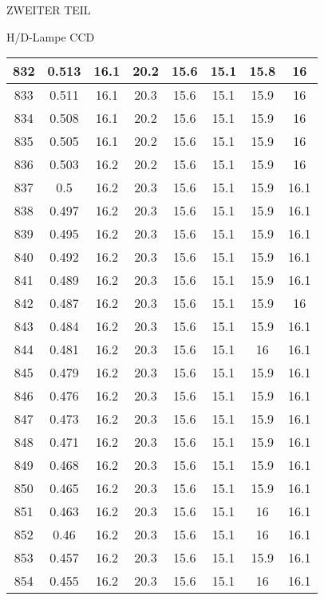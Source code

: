 \begin{appendix}
\begin{chapter}{ZWEITER TEIL}
\begin{section}{H/D-Lampe CCD}
\begin{scriptsize}
\begin{longtable}[htbp]{|c|c|c|c|c|c|c|c|}
            832 & 0.513 & 16.1 & 20.2 & 15.6 & 15.1 & 15.8 & 16 \\ \hline
            833 & 0.511 & 16.1 & 20.3 & 15.6 & 15.1 & 15.9 & 16 \\ \hline
            834 & 0.508 & 16.1 & 20.2 & 15.6 & 15.1 & 15.9 & 16 \\ \hline
            835 & 0.505 & 16.1 & 20.2 & 15.6 & 15.1 & 15.9 & 16 \\ \hline
            836 & 0.503 & 16.2 & 20.2 & 15.6 & 15.1 & 15.9 & 16 \\ \hline
            837 & 0.5 & 16.2 & 20.3 & 15.6 & 15.1 & 15.9 & 16.1 \\ \hline
            838 & 0.497 & 16.2 & 20.3 & 15.6 & 15.1 & 15.9 & 16.1 \\ \hline
            839 & 0.495 & 16.2 & 20.3 & 15.6 & 15.1 & 15.9 & 16.1 \\ \hline
            840 & 0.492 & 16.2 & 20.3 & 15.6 & 15.1 & 15.9 & 16.1 \\ \hline
            841 & 0.489 & 16.2 & 20.3 & 15.6 & 15.1 & 15.9 & 16.1 \\ \hline
            842 & 0.487 & 16.2 & 20.3 & 15.6 & 15.1 & 15.9 & 16 \\ \hline
            843 & 0.484 & 16.2 & 20.3 & 15.6 & 15.1 & 15.9 & 16.1 \\ \hline
            844 & 0.481 & 16.2 & 20.3 & 15.6 & 15.1 & 16 & 16.1 \\ \hline
            845 & 0.479 & 16.2 & 20.3 & 15.6 & 15.1 & 15.9 & 16.1 \\ \hline
            846 & 0.476 & 16.2 & 20.3 & 15.6 & 15.1 & 15.9 & 16.1 \\ \hline
            847 & 0.473 & 16.2 & 20.3 & 15.6 & 15.1 & 15.9 & 16.1 \\ \hline
            848 & 0.471 & 16.2 & 20.3 & 15.6 & 15.1 & 15.9 & 16.1 \\ \hline
            849 & 0.468 & 16.2 & 20.3 & 15.6 & 15.1 & 15.9 & 16.1 \\ \hline
            850 & 0.465 & 16.2 & 20.3 & 15.6 & 15.1 & 15.9 & 16.1 \\ \hline
            851 & 0.463 & 16.2 & 20.3 & 15.6 & 15.1 & 16 & 16.1 \\ \hline
            852 & 0.46 & 16.2 & 20.3 & 15.6 & 15.1 & 16 & 16.1 \\ \hline
            853 & 0.457 & 16.2 & 20.3 & 15.6 & 15.1 & 15.9 & 16.1 \\ \hline
            854 & 0.455 & 16.2 & 20.3 & 15.6 & 15.1 & 16 & 16.1 \\ \hline

\end{longtable}
\end{scriptsize}
\end{section}
\end{chapter}
\end{appendix}

